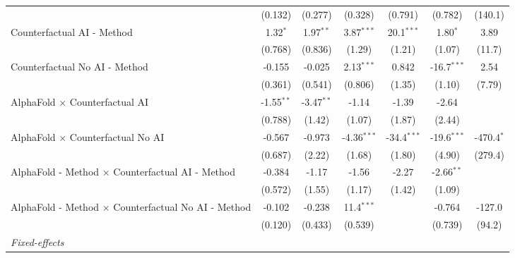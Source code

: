 \begin{tabular}{lcccccc}
                                                              & (0.132)       & (0.277)       & (0.328)       & (0.791)       & (0.782)       & (140.1)\\   
   Counterfactual AI - Method                                 & 1.32$^{*}$    & 1.97$^{**}$   & 3.87$^{***}$  & 20.1$^{***}$  & 1.80$^{*}$    & 3.89\\   
                                                              & (0.768)       & (0.836)       & (1.29)        & (1.21)        & (1.07)        & (11.7)\\   
   Counterfactual No AI - Method                              & -0.155        & -0.025        & 2.13$^{***}$  & 0.842         & -16.7$^{***}$ & 2.54\\   
                                                              & (0.361)       & (0.541)       & (0.806)       & (1.35)        & (1.10)        & (7.79)\\   
   AlphaFold $\times$ Counterfactual AI                       & -1.55$^{**}$  & -3.47$^{**}$  & -1.14         & -1.39         & -2.64         &   \\   
                                                              & (0.788)       & (1.42)        & (1.07)        & (1.87)        & (2.44)        &   \\   
   AlphaFold $\times$ Counterfactual No AI                    & -0.567        & -0.973        & -4.36$^{***}$ & -34.4$^{***}$ & -19.6$^{***}$ & -470.4$^{*}$\\   
                                                              & (0.687)       & (2.22)        & (1.68)        & (1.80)        & (4.90)        & (279.4)\\   
   AlphaFold - Method $\times$ Counterfactual AI - Method     & -0.384        & -1.17         & -1.56         & -2.27         & -2.66$^{**}$  &   \\   
                                                              & (0.572)       & (1.55)        & (1.17)        & (1.42)        & (1.09)        &   \\   
   AlphaFold - Method $\times$ Counterfactual No AI - Method  & -0.102        & -0.238        & 11.4$^{***}$  &               & -0.764        & -127.0\\   
                                                              & (0.120)       & (0.433)       & (0.539)       &               & (0.739)       & (94.2)\\   
   \midrule
   \emph{Fixed-effects}\\

\end{tabular}
